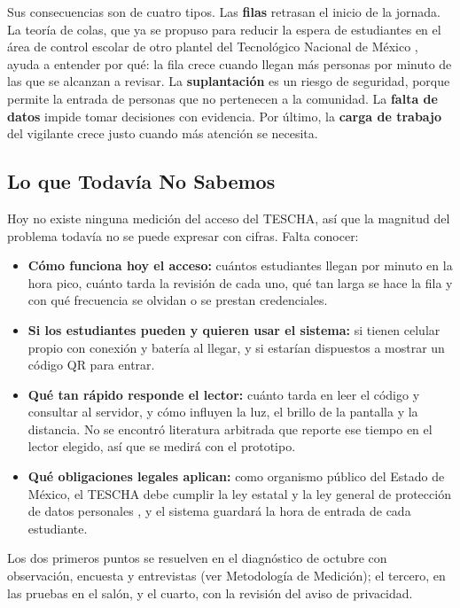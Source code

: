 Sus consecuencias son de cuatro tipos. Las \textbf{filas} retrasan el inicio
de la jornada. La teoría de colas, que ya se propuso para reducir la espera de
estudiantes en el área de control escolar de otro plantel del Tecnológico
Nacional de México \parencite{talavera2025espera}, ayuda a entender por qué:
la fila crece cuando llegan más personas por minuto de las que se alcanzan a
revisar. La \textbf{suplantación} es un riesgo de seguridad, porque permite la
entrada de personas que no pertenecen a la comunidad. La \textbf{falta de
	datos} impide tomar decisiones con evidencia. Por último, la \textbf{carga de
	trabajo} del vigilante crece justo cuando más atención se necesita.

\subsection{Lo que Todavía No Sabemos}
Hoy no existe ninguna medición del acceso del TESCHA, así que la magnitud del
problema todavía no se puede expresar con cifras. Falta conocer:
\begin{itemize}
	\item \textbf{Cómo funciona hoy el acceso:} cuántos estudiantes llegan por
	      minuto en la hora pico, cuánto tarda la revisión de cada uno, qué tan
	      larga se hace la fila y con qué frecuencia se olvidan o se prestan
	      credenciales.
	\item \textbf{Si los estudiantes pueden y quieren usar el sistema:} si tienen
	      celular propio con conexión y batería al llegar, y si estarían
	      dispuestos a mostrar un código QR para entrar.
	\item \textbf{Qué tan rápido responde el lector:} cuánto tarda en leer el
	      código y consultar al servidor, y cómo influyen la luz, el brillo de la
	      pantalla y la distancia. No se encontró literatura arbitrada que reporte
	      ese tiempo en el lector elegido, así que se medirá con el prototipo.
	\item \textbf{Qué obligaciones legales aplican:} como organismo público del
	      Estado de México, el TESCHA debe cumplir la ley estatal y la ley general
	      de protección de datos personales \parencite{edomex2017datos,
		      lgpdppso2025}, y el sistema guardará la hora de entrada de cada
	      estudiante.
\end{itemize}
Los dos primeros puntos se resuelven en el diagnóstico de octubre con
observación, encuesta y entrevistas (ver Metodología de Medición); el tercero,
en las pruebas en el salón, y el cuarto, con la revisión del aviso de
privacidad.

